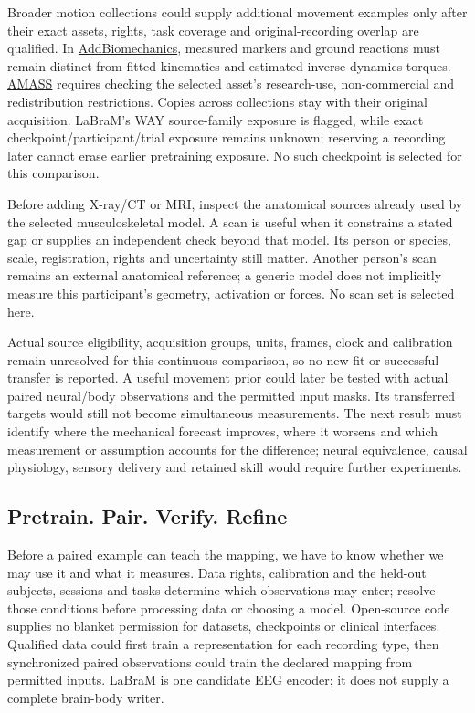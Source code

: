 Broader motion collections could supply additional movement examples only after their exact assets, rights, task coverage and original-recording overlap are qualified. In \href{https://www.addbiomechanics.org/download_data.html}{AddBiomechanics}, measured markers and ground reactions must remain distinct from fitted kinematics and estimated inverse-dynamics torques. \href{https://amass.is.tue.mpg.de/license.html}{AMASS} requires checking the selected asset's research-use, non-commercial and redistribution restrictions. Copies across collections stay with their original acquisition. LaBraM's WAY source-family exposure is flagged, while exact checkpoint/participant/trial exposure remains unknown; reserving a recording later cannot erase earlier pretraining exposure. No such checkpoint is selected for this comparison.

Before adding X-ray/CT or MRI, inspect the anatomical sources already used by the selected musculoskeletal model. A scan is useful when it constrains a stated gap or supplies an independent check beyond that model. Its person or species, scale, registration, rights and uncertainty still matter. Another person's scan remains an external anatomical reference; a generic model does not implicitly measure this participant's geometry, activation or forces. No scan set is selected here.

Actual source eligibility, acquisition groups, units, frames, clock and calibration remain unresolved for this continuous comparison, so no new fit or successful transfer is reported. A useful movement prior could later be tested with actual paired neural/body observations and the permitted input masks. Its transferred targets would still not become simultaneous measurements. The next result must identify where the mechanical forecast improves, where it worsens and which measurement or assumption accounts for the difference; neural equivalence, causal physiology, sensory delivery and retained skill would require further experiments.

\subsection{Pretrain. Pair. Verify. Refine}
Before a paired example can teach the mapping, we have to know whether we may use it and what it measures. Data rights, calibration and the held-out subjects, sessions and tasks determine which observations may enter; resolve those conditions before processing data or choosing a model. Open-source code supplies no blanket permission for datasets, checkpoints or clinical interfaces. Qualified data could first train a representation for each recording type, then synchronized paired observations could train the declared mapping from permitted inputs. LaBraM is one candidate EEG encoder; it does not supply a complete brain-body writer.

